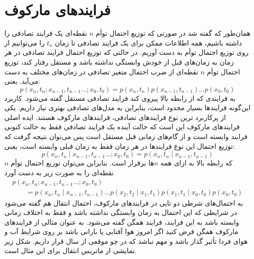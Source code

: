 \section{فرایندهای مارکوف}
\label{sec:markov}

همان‌طور که گفته شد در صورتی که توزیع احتمال توأم $n$ نقطه‌ای  یک فرایند تصادفی را داشته باشیم، همه اطلاعات ممکن برای یک فرایند تصادفی تا زمان $t_n$ را می‌توانیم از روی توزیع احتمال توأم به دست آوریم. در حالتی که توزیع احتمال فرایند تصادفی در هر زمان به زمان‌های قبل از خودش وابستگی نداشته باشد و مستقل رفتار کند، توزیع احتمال توأم $n$ نقطه‌ای از ضرب احتمال متغیر تصادفی در زمان‌های مختلف به دست می‌آید. یعنی:
\begin{equation}
  p(x_n,t_n; x_{n-1},t_{n-1} \dotsc ;x_{0},t_0)  = p(x_{n}, t_{n}) p(x_{n-1}, t_{n-1}) \dotsc p(x_0,t_0)
  \label{n_point_joint}
\end{equation}
به فرایندی که از رابطه بالا پیروی کند فرایند تصادفی مستقل گفته می‌شود. کاربرد این‌گونه فرایندها بسیار محدود است، بنابراین به مدل‌های تصادفی بهتری نیاز داریم.
یکی از پرکاربرد ترین نوع فرایندهای تصادفی، فرایندهای مارکوف هستند. ایده اصلی فرایندهای مارکوف این است که حالت آینده یک فرایند تصادفی فقط به حالت کنونی فرایند وابسته است و از گام‌های زمانی قبل مستقل است پس می‌توان نتیجه گرفت که  توزیع احتمال این نوع فرایندها در هر زمان فقط به زمان قبلی وابسته است، یعنی:
\begin{equation}
  p(x_n,t_n \mid x_{n-1},t_{n-1} \dotsc ;x_{0},t_0) = p(x_n,t_n \mid x_{n-1},t_{n-1})
  \label{markov_def}
\end{equation}
 که رابطه بالا به ازای همه $n$ها برقرار است. بنابراین می‌توان توزیع احتمال توأم $n$ نقطه‌ای را به صورت زیر به دست آورد 
 \begin{equation}
  \begin{array}{l}
    p(x_n,t_n; x_{n-1},t_{n-1} \dotsc ;x_{0},t_0)\\ \qquad = p(x_{n},t_n\mid x_{n-1},t_{n-1}) \dotsc p(x_{2},t_{2} \mid x_{1},t_{1}) p(x_{1},t_{1} \mid x_{0},t_{0}) p(x_0,t_0)
    \label{markov}
  \end{array}
\end{equation}
به احتمال‌های شرطی دو تایی در فرایندهای مارکوف، احتمال انتقال هم گفته می‌شود در شرایطی که این احتمال به زمان وابستگی نداشته باشد و فقط به اختلاف زمانی وابسته باشد به این فرایند، فرایند همگن گفته می‌شود. 
به عنوان مثالی از فرایندهای مارکوف همگن فرض کنید اگر امروز هوا آفتابی یا بارانی باشد بر روی شرایط آب و هوای فردا تأثیر گذار باشد و مهم نباشد که در چو موقعی از سال قرار داریم. شکل زیر نمایشی از ماتریس انتقال برای این مثال است.
